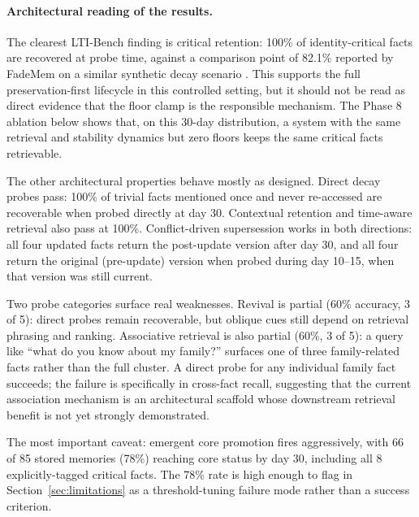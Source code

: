 \documentclass[11pt,a4paper]{article}
\begin{document}
\paragraph{Architectural reading of the results.} The clearest LTI-Bench finding is critical retention: 100\% of identity-critical facts are recovered at probe time, against a comparison point of 82.1\% reported by FadeMem on a similar synthetic decay scenario \citep{wei2026fademem}. This supports the full preservation-first lifecycle in this controlled setting, but it should not be read as direct evidence that the floor clamp is the responsible mechanism. The Phase 8 ablation below shows that, on this 30-day distribution, a system with the same retrieval and stability dynamics but zero floors keeps the same critical facts retrievable.

The other architectural properties behave mostly as designed. Direct decay probes pass: 100\% of trivial facts mentioned once and never re-accessed are recoverable when probed directly at day 30. Contextual retention and time-aware retrieval also pass at 100\%. Conflict-driven supersession works in both directions: all four updated facts return the post-update version after day 30, and all four return the original (pre-update) version when probed during day 10--15, when that version was still current.

Two probe categories surface real weaknesses. Revival is partial (60\% accuracy, 3 of 5): direct probes remain recoverable, but oblique cues still depend on retrieval phrasing and ranking. Associative retrieval is also partial (60\%, 3 of 5): a query like ``what do you know about my family?'' surfaces one of three family-related facts rather than the full cluster. A direct probe for any individual family fact succeeds; the failure is specifically in cross-fact recall, suggesting that the current association mechanism is an architectural scaffold whose downstream retrieval benefit is not yet strongly demonstrated.

The most important caveat: emergent core promotion fires aggressively, with 66 of 85 stored memories (78\%) reaching core status by day 30, including all 8 explicitly-tagged critical facts. The 78\% rate is high enough to flag in Section~\ref{sec:limitations} as a threshold-tuning failure mode rather than a success criterion.
\end{document}
